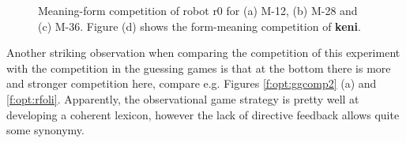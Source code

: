 \begin{figure}[t]
\centering
{}
\caption{Meaning-form competition of robot r0 for (a) M-12, (b) M-28 and (c) M-36. Figure (d) shows the form-meaning competition of {\bf keni}.}
\label{f:opt:cfoli}
\end{figure}


Another striking observation when comparing the competition of this experiment with the competition in the guessing games is that at the bottom there is more and stronger competition here, compare e.g. Figures \ref{f:opt:ggcomp2} (a) and \ref{f:opt:rfoli}. Apparently, the observational game strategy is pretty well at developing a coherent lexicon, however the lack of directive feedback allows quite some synonymy. 

